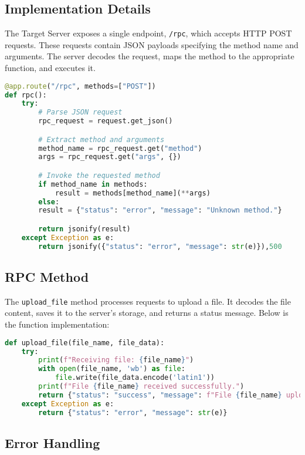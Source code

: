 \documentclass{article}
\begin{document}
\subsection{Implementation Details}
The Target Server exposes a single endpoint, \texttt{/rpc}, which accepts HTTP POST requests. These requests contain JSON payloads specifying the method name and arguments. The server decodes the request, maps the method to the appropriate function, and executes it.

\begin{lstlisting}[language=Python, caption=Server Endpoint Implementation]
@app.route("/rpc", methods=["POST"])
def rpc():
    try:
        # Parse JSON request
        rpc_request = request.get_json()

        # Extract method and arguments
        method_name = rpc_request.get("method")
        args = rpc_request.get("args", {})

        # Invoke the requested method
        if method_name in methods:
            result = methods[method_name](**args)
        else:
        result = {"status": "error", "message": "Unknown method."}

        return jsonify(result)
    except Exception as e:
        return jsonify({"status": "error", "message": str(e)}),500
\end{lstlisting}

\subsection{RPC Method}
The \texttt{upload\_file} method processes requests to upload a file. It decodes the file content, saves it to the server's storage, and returns a status message. Below is the function implementation:

\begin{lstlisting}[language=Python, caption=File Upload Method]
def upload_file(file_name, file_data):
    try:
        print(f"Receiving file: {file_name}")
        with open(file_name, 'wb') as file:
            file.write(file_data.encode('latin1'))
        print(f"File {file_name} received successfully.")
        return {"status": "success", "message": f"File {file_name} uploaded successfully."}
    except Exception as e:
        return {"status": "error", "message": str(e)}
\end{lstlisting}

\subsection{Error Handling}
\end{document}

